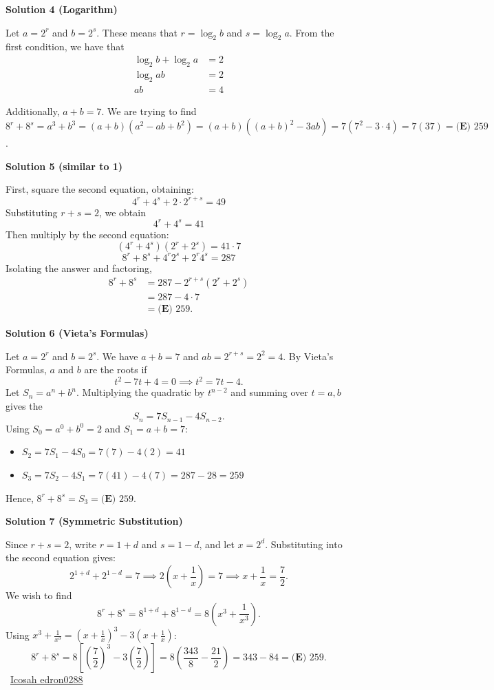 \begin{enumerate}
\textbf{Solution 4 (Logarithm)}

Let $a = 2^r$ and $b = 2^s$. These means that $r = \log_2{b}$ and $s = \log_2{a}$. From the first condition, we have that \begin{align*}\log_2{b}+\log_2{a} &=2 \\\log_2{ab} &=2 \\ab &= 4\end{align*}


 Additionally, $a+b = 7$. We are trying to find $8^r+8^s = a^3+b^3 = (a+b)(a^2-ab+b^2) = (a+b)((a+b)^2-3ab) = 7(7^2-3\cdot4) = 7(37) =\boxed{\textbf{(E) }259}$. 

 



\textbf{Solution 5 (similar to 1)}

First, square the second equation, obtaining:
 \[4^r+4^s+2 \cdot 2^{r+s}=49\]Substituting $r+s=2$, we obtain
 \[4^r+4^s=41\] Then multiply by the second equation:
 \[(4^r+4^s)(2^r+2^s)=41\cdot 7\]
 \[8^r+8^s+4^r2^s+2^r4^s=287\]Isolating the answer and factoring,\begin{align*}8^r+8^s&=287 - 2^{r+s}(2^r+2^s) \\&=287 - 4\cdot 7 \\&=\boxed{\textbf{(E) }259}.\end{align*}


 



\textbf{Solution 6 (Vieta's Formulas)}

Let $a = 2^r$ and $b = 2^s$. We have $a + b = 7$ and $ab = 2^{r+s} = 2^2 = 4$. By Vieta's Formulas, $a$ and $b$ are the roots if
 \[t^2 - 7t + 4 = 0 \implies t^2 = 7t - 4.\]Let $S_n = a^n + b^n$. Multiplying the quadratic by $t^{n-2}$ and summing over $t = a, b$ gives the 
 \[S_n = 7S_{n-1} - 4S_{n-2}.\]Using $S_0 = a^0 + b^0 = 2$ and $S_1 = a + b = 7$:

 
            \begin{itemize}
        \item $S_2 = 7S_1 - 4S_0 = 7(7) - 4(2) = 41$
        \item $S_3 = 7S_2 - 4S_1 = 7(41) - 4(7) = 287 - 28 = 259$
            \end{itemize}
            Hence, $8^r + 8^s = S_3 = \boxed{\textbf{(E) } 259}$.

 



\textbf{Solution 7 (Symmetric Substitution)}

Since $r + s = 2$, write $r = 1 + d$ and $s = 1 - d$, and let $x = 2^d$. Substituting into the second equation gives:
 \[2^{1+d} + 2^{1-d} = 7 \implies 2\left(x + \frac{1}{x}\right) = 7 \implies x + \frac{1}{x} = \frac{7}{2}.\]We wish to find
 \[8^r + 8^s = 8^{1+d} + 8^{1-d} = 8\left(x^3 + \frac{1}{x^3}\right).\]Using $x^3 + \frac{1}{x^3} = \left(x + \frac{1}{x}\right)^3 - 3\left(x + \frac{1}{x}\right)$:
 \[8^r + 8^s = 8\left[\left(\frac{7}{2}\right)^3 - 3\left(\frac{7}{2}\right)\right] = 8\left(\frac{343}{8} - \frac{21}{2}\right) = 343 - 84 = \boxed{\textbf{(E) } 259}.\]~\href{https://artofproblemsolving.com/wiki/index.php?title=User\%EF\%BC\%9AIcosahedron0288\#Created\_Pages}{Icosah edron0288}


\end{enumerate}
